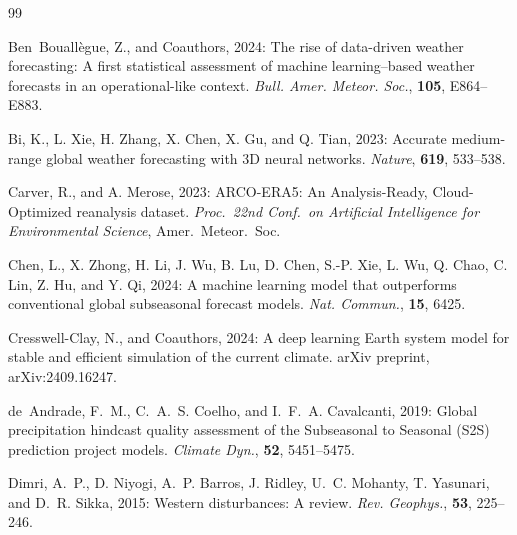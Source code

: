 \documentclass[11pt]{article}
\begin{document}
\begin{thebibliography}{99}

Ben~Bouall\`egue, Z., and Coauthors, 2024: The rise of data-driven
weather forecasting: A first statistical assessment of machine
learning--based weather forecasts in an operational-like context.
\textit{Bull. Amer. Meteor. Soc.}, \textbf{105}, E864--E883. %

Bi, K., L. Xie, H. Zhang, X. Chen, X. Gu, and Q. Tian, 2023: Accurate
medium-range global weather forecasting with 3D neural networks.
\textit{Nature}, \textbf{619}, 533--538.

Carver, R., and A. Merose, 2023: ARCO-ERA5: An Analysis-Ready,
Cloud-Optimized reanalysis dataset. \textit{Proc.\ 22nd Conf.\ on
Artificial Intelligence for Environmental Science}, Amer.\ Meteor.\
Soc. %

Chen, L., X. Zhong, H. Li, J. Wu, B. Lu, D. Chen, S.-P. Xie, L. Wu,
Q. Chao, C. Lin, Z. Hu, and Y. Qi, 2024: A machine learning model
that outperforms conventional global subseasonal forecast models.
\textit{Nat. Commun.}, \textbf{15}, 6425. %

Cresswell-Clay, N., and Coauthors, 2024: A deep learning Earth system
model for stable and efficient simulation of the current climate.
arXiv preprint, arXiv:2409.16247. %

de~Andrade, F.~M., C.~A.~S. Coelho, and I.~F.~A. Cavalcanti, 2019:
Global precipitation hindcast quality assessment of the Subseasonal
to Seasonal (S2S) prediction project models. \textit{Climate Dyn.},
\textbf{52}, 5451--5475.

Dimri, A.~P., D. Niyogi, A.~P. Barros, J. Ridley, U.~C. Mohanty,
T. Yasunari, and D.~R. Sikka, 2015: Western disturbances: A review.
\textit{Rev. Geophys.}, \textbf{53}, 225--246.


\end{thebibliography}
\end{document}
